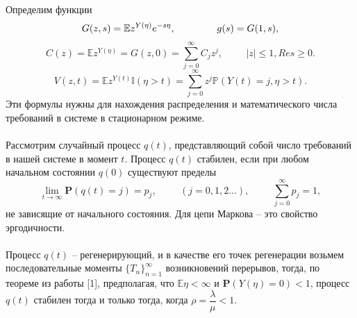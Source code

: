 \documentclass[12pt]{article}
\begin{document}
Определим функции
$$G(z,s) = \mathbb{E}z^{Y(\eta)}e^{-s\eta}, \hspace{1.5cm} g(s) = G(1,s), $$
$$C(z) = \mathbb{E}z^{Y(\eta)} = G(z,0) = \sum\limits^\infty_{j=0}C_jz^j, \hspace{1cm} |z| \leqslant 1, Re s \geqslant 0.$$
$$V(z,t) = \mathbb{E}z^{Y(t)}\mathbb{I}(\eta > t) = \sum\limits^{\infty}_{j=0}z^j\mathbb{P}(Y(t)=j, \eta > t). $$
Эти формулы нужны для нахождения распределения и математического числа требований в системе в стационарном режиме.\\ 
\\
Рассмотрим случайный процесс $q(t)$, представляющий собой число требований в нашей системе в момент $t$. Процесс $q(t)$ стабилен, если при любом начальном состоянии $q(0)$ существуют пределы
$$\lim_{t\to\infty} \textbf{P}(q(t) = j) = p_j, \hspace{1cm} (j = 0, 1, 2 ...), \hspace{1cm} \sum\limits^{\infty}_{j=0} p_j = 1, $$ 
не зависящие от начального состояния. Для цепи Маркова -- это свойство эргодичности.\\
\\
Процесс $q(t)$ -- регенерирующий, и в качестве его точек регенерации возьмем последовательные моменты $\{T_n\}^\infty_{n=1}$ возникновений перерывов, тогда, по теореме из работы [1], предполагая, что $\mathbb{E}\eta < \infty$ и $\textbf{P}(Y(\eta) = 0) < 1$, процесс $q(t)$ стабилен тогда и только тогда, когда $\rho = \dfrac{\lambda}{\mu} < 1.$
\end{document}
